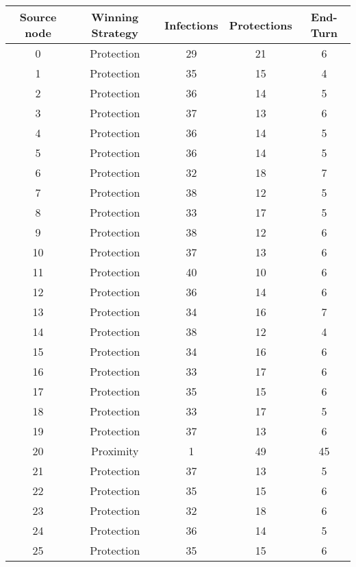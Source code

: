 \documentclass[results.tex]{subfiles}
\begin{document}
\begin{center}
  \begin{tabular}{| c || c | c | c | c |}
    \hline
    {\bfseries Source node} & {\bfseries Winning Strategy} & {\bfseries Infections} & {\bfseries Protections} & {\bfseries End-Turn} \\  %
    \hline\hline
    0 & Protection & 29 & 21 & 6 \\ 
    \hline
    1 & Protection & 35 & 15 & 4 \\ 
    \hline
    2 & Protection & 36 & 14 & 5 \\ 
    \hline
    3 & Protection & 37 & 13 & 6 \\ 
    \hline
    4 & Protection & 36 & 14 & 5 \\ 
    \hline
    5 & Protection & 36 & 14 & 5 \\ 
    \hline
    6 & Protection & 32 & 18 & 7 \\ 
    \hline
    7 & Protection & 38 & 12 & 5 \\ 
    \hline
    8 & Protection & 33 & 17 & 5 \\ 
    \hline
    9 & Protection & 38 & 12 & 6 \\ 
    \hline
    10 & Protection & 37 & 13 & 6 \\ 
    \hline
    11 & Protection & 40 & 10 & 6 \\ 
    \hline
    12 & Protection & 36 & 14 & 6 \\ 
    \hline
    13 & Protection & 34 & 16 & 7 \\ 
    \hline
    14 & Protection & 38 & 12 & 4 \\ 
    \hline
    15 & Protection & 34 & 16 & 6 \\ 
    \hline
    16 & Protection & 33 & 17 & 6 \\ 
    \hline
    17 & Protection & 35 & 15 & 6 \\ 
    \hline
    18 & Protection & 33 & 17 & 5 \\ 
    \hline
    19 & Protection & 37 & 13 & 6 \\ 
    \hline
    20 & Proximity & 1 & 49 & 45 \\ 
    \hline
    21 & Protection & 37 & 13 & 5 \\ 
    \hline
    22 & Protection & 35 & 15 & 6 \\ 
    \hline
    23 & Protection & 32 & 18 & 6 \\ 
    \hline
    24 & Protection & 36 & 14 & 5 \\ 
    \hline
    25 & Protection & 35 & 15 & 6 \\ 

\end{tabular}
\end{center}
\end{document}
